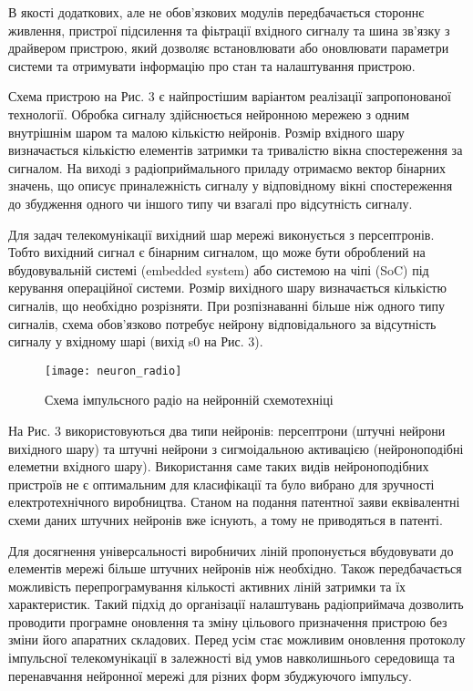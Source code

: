 В якості додаткових, але не обов'язкових модулів передбачається стороннє 
живлення, пристрої підсилення та фіьтрації вхідного сигналу та шина зв'язку 
з драйвером пристрою, який дозволяє встановлювати або оновлювати параметри 
системи та отримувати інформацію про стан та налаштування пристрою.

Схема пристрою на Рис. 3 є найпростішим варіантом реалізації 
запропонованої технології. Обробка сигналу здійснюється нейронною 
мережею з одним внутрішнім шаром та малою кількістю нейронів. Розмір 
вхідного шару визначається кількістю елементів затримки та тривалістю 
вікна спостереження за сигналом. На виході з радіоприймального приладу 
отримаємо вектор бінарних значень, що описує приналежність сигналу у 
відповідному вікні спостереження до збудження одного чи іншого типу чи 
взагалі про відсутність сигналу. 

Для задач телекомунікації вихідний шар мережі виконується з персептронів. 
Тобто вихідний сигнал є бінарним сигналом, що може бути оброблений на 
вбудовувальній системі (embedded system) або системою на чіпі (SoC) 
під керування операційної системи. Розмір вихідного шару визначається 
кількістю сигналів, що необхідно розрізняти. При розпізнаванні більше 
ніж одного типу сигналів, схема обов'язково потребує нейрону 
відповідального за відсутність сигналу у вхідному шарі 
(вихід s0 на Рис. 3).

\begin{figure}[htbp] \begin{center}
\texttt{[image: neuron\_radio]}
\caption{Схема імпульсного радіо на нейронній схемотехніці} 
\label{fig:neural_radio}
\end{center} \end{figure}

На Рис. 3 використовуються два типи нейронів: персептрони 
(штучні нейрони вихідного шару) та штучні нейрони з сигмоідальною 
активацією (нейроноподібні елеметни вхідного шару). Використання саме 
таких видів нейроноподібних пристроїв не є оптимальним для класифікації 
та було вибрано для зручності електротехнічного виробництва. Станом на 
подання патентної заяви еквівалентні схеми даних штучних нейронів вже 
існують, а тому не приводяться в патенті.

Для досягнення універсальності виробничих ліній пропонується вбудовувати 
до елементів мережі більше штучних нейронів ніж необхідно. Також 
передбачається можливість перепрограмування кількості активних ліній 
затримки та їх характеристик. Такий підхід до організації налаштувань 
радіоприймача дозволить проводити програмне оновлення та зміну цільового 
призначення пристрою без зміни його апаратних складових.  Перед усім стає 
можливим оновлення протоколу імпульсної телекомунікації в залежності від 
умов навколишнього середовища та перенавчання нейронної мережі для різних 
форм збуджуючого імпульсу.

